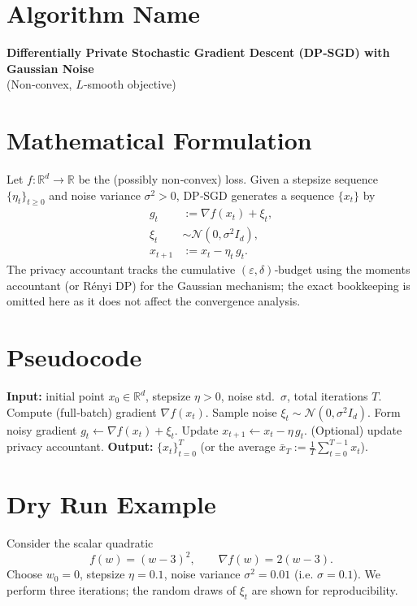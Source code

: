 \documentclass[11pt]{article}
\newcommand{\R}{\mathbb{R}}
\begin{document}
\section*{Algorithm Name}
\textbf{Differentially Private Stochastic Gradient Descent (DP‑SGD) with Gaussian Noise}\\
(Non‑convex, $L$‑smooth objective)

\section*{Mathematical Formulation}
Let $f:\R^{d}\rightarrow\R$ be the (possibly non‑convex) loss.  
Given a stepsize sequence $\{\eta_t\}_{t\ge 0}$ and noise variance $\sigma^{2}>0$, DP‑SGD generates a sequence $\{x_t\}$ by  
\[
\boxed{
\begin{aligned}
g_t &:= \nabla f(x_t) + \xi_t,\\
\xi_t &\sim \mathcal{N}(0,\sigma^{2}I_d),\\
x_{t+1} &:= x_t - \eta_t\, g_t .
\end{aligned}}
\tag{1}
\]
The privacy accountant tracks the cumulative $(\varepsilon,\delta)$‑budget using the moments accountant (or R\'enyi DP) for the Gaussian mechanism; the exact bookkeeping is omitted here as it does not affect the convergence analysis.

\section*{Pseudocode}
\begin{algorithm}[H]
\caption{DP‑SGD with Gaussian Noise}
\begin{algorithmic}[1]
\STATE \textbf{Input:} initial point $x_0\in\R^{d}$, stepsize $\eta>0$, noise std.\ $\sigma$, total iterations $T$.
    \STATE Compute (full‑batch) gradient $\nabla f(x_t)$.
    \STATE Sample noise $\xi_t\sim\mathcal{N}(0,\sigma^{2}I_d)$.
    \STATE Form noisy gradient $g_t\gets \nabla f(x_t)+\xi_t$.
    \STATE Update $x_{t+1}\gets x_t-\eta\, g_t$.
    \STATE (Optional) update privacy accountant.
\ENDFOR
\STATE \textbf{Output:} $\{x_t\}_{t=0}^{T}$ (or the average $\bar x_T:=\frac1T\sum_{t=0}^{T-1}x_t$).
\end{algorithmic}
\end{algorithm}

\section*{Dry Run Example}
Consider the scalar quadratic
\[
f(w)=(w-3)^2,\qquad \nabla f(w)=2(w-3).
\]
Choose $w_0=0$, stepsize $\eta=0.1$, noise variance $\sigma^{2}=0.01$ (i.e. $\sigma=0.1$).  
We perform three iterations; the random draws of $\xi_t$ are shown for reproducibility.
\end{document}
